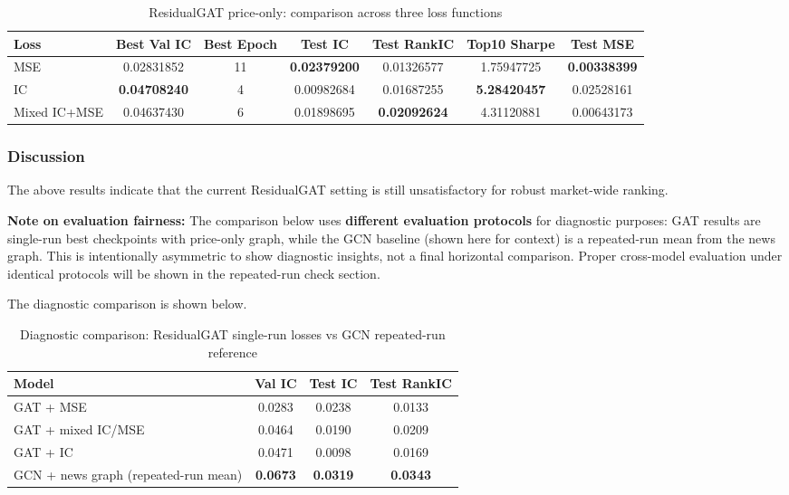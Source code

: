 \begin{table}[htbp]
\centering
\caption{ResidualGAT price-only: comparison across three loss functions}
\label{tab:residualgat-loss-comparison}
\begin{tabular}{lcccccc}
\hline
Loss & Best Val IC & Best Epoch & Test IC & Test RankIC & Top10 Sharpe & Test MSE \\
\hline
MSE & 0.02831852 & 11 & \textbf{0.02379200} & 0.01326577 & 1.75947725 & \textbf{0.00338399} \\
IC & \textbf{0.04708240} & 4 & 0.00982684 & 0.01687255 & \textbf{5.28420457} & 0.02528161 \\
Mixed IC+MSE & 0.04637430 & 6 & 0.01898695 & \textbf{0.02092624} & 4.31120881 & 0.00643173 \\
\hline
\end{tabular}
\end{table}

\subsubsection{Discussion}

The above results indicate that the current ResidualGAT setting is still unsatisfactory for robust market-wide ranking. 

\textbf{Note on evaluation fairness:} The comparison below uses \textbf{different evaluation protocols} for diagnostic purposes: GAT results are single-run best checkpoints with price-only graph, while the GCN baseline (shown here for context) is a repeated-run mean from the news graph. This is intentionally asymmetric to show diagnostic insights, not a final horizontal comparison. Proper cross-model evaluation under identical protocols will be shown in the repeated-run check section.

The diagnostic comparison is shown below.

\begin{table}[htbp]
\centering
\caption{Diagnostic comparison: ResidualGAT single-run losses vs GCN repeated-run reference}
\label{tab:gat-vs-gcn-key-comparison}
\begin{tabular}{lccc}
\hline
Model & Val IC & Test IC & Test RankIC \\
\hline
GAT + MSE & 0.0283 & 0.0238 & 0.0133 \\
GAT + mixed IC/MSE & 0.0464 & 0.0190 & 0.0209 \\
GAT + IC & 0.0471 & 0.0098 & 0.0169 \\
GCN + news graph (repeated-run mean) & \textbf{0.0673} & \textbf{0.0319} & \textbf{0.0343} \\
\hline
\end{tabular}
\end{table}

